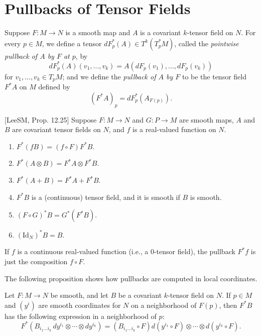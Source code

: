 \section{Pullbacks of Tensor Fields}

Suppose $F: M \to N$ is a smooth map and $A$ is a covariant $k$-tensor field on $N$. For every $p \in M$, we define a tensor $dF_p^*(A) \in T^k(T_p^* M)$, called the \emph{pointwise pullback of $A$ by $F$ at $p$}, by
\[
dF_p^*(A)(v_1, \ldots, v_k) = A(dF_p(v_1), \ldots, dF_p(v_k))
\]
for $v_1, \ldots, v_k \in T_p M$; and we define the \emph{pullback of $A$ by $F$} to be the tensor field $F^* A$ on $M$ defined by
\[
(F^* A)_p = dF_p^*(A_{F(p)}).
\]

\begin{proposition}
\label{prop:tensor-pullback-properties}

[LeeSM, Prop. 12.25] Suppose $F: M \to N$ and $G: P \to M$ are smooth maps, $A$ and $B$ are covariant tensor fields on $N$, and $f$ is a real-valued function on $N$.
\begin{enumerate}
\item[(a)] $F^*(fB) = (f \circ F) F^* B$.
\item[(b)] $F^*(A \otimes B) = F^* A \otimes F^* B$.
\item[(c)] $F^*(A + B) = F^* A + F^* B$.
\item[(d)] $F^* B$ is a (continuous) tensor field, and it is smooth if $B$ is smooth.
\item[(e)] $(F \circ G)^* B = G^*(F^* B)$.
\item[(f)] $(\text{Id}_N)^* B = B$.
\end{enumerate}
\end{proposition}

If $f$ is a continuous real-valued function (i.e., a 0-tensor field), the pullback $F^* f$ is just the composition $f \circ F$.

The following proposition shows how pullbacks are computed in local coordinates.

\begin{proposition}
\label{prop:pullback-computation-coordinates}


Let $F: M \to N$ be smooth, and let $B$ be a covariant $k$-tensor field on $N$. If $p \in M$ and $(y^i)$ are smooth coordinates for $N$ on a neighborhood of $F(p)$, then $F^* B$ has the following expression in a neighborhood of $p$:
\[
F^* \left( B_{i_1 \ldots i_k} \, dy^{i_1} \otimes \cdots \otimes dy^{i_k} \right) = \left( B_{i_1 \ldots i_k} \circ F \right) d(y^{i_1} \circ F) \otimes \cdots \otimes d(y^{i_k} \circ F).
\]
\end{proposition}

